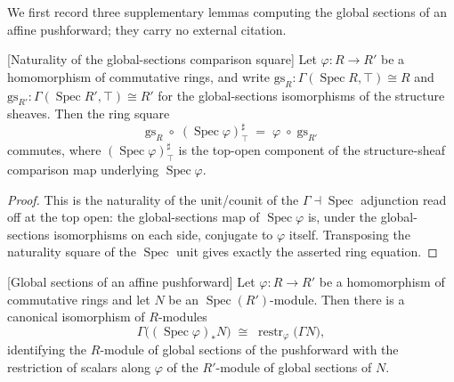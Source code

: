 We first record three supplementary lemmas computing the global sections of an
affine pushforward; they carry no external citation.

\begin{lemma}


[Naturality of the global-sections comparison square]
  \label{lem:globalSectionsIso_hom_comp_specMap_appTop}
  Let \(\varphi : R \to R'\) be a homomorphism of commutative rings, and write
  \(\mathrm{gs}_R : \Gamma(\operatorname{Spec} R, \top) \cong R\) and
  \(\mathrm{gs}_{R'} : \Gamma(\operatorname{Spec} R', \top) \cong R'\) for the
  global-sections isomorphisms of the structure sheaves. Then the ring square
  \[
    \mathrm{gs}_R \;\circ\; (\operatorname{Spec}\varphi)^{\sharp}_{\top}
    \;=\; \varphi \;\circ\; \mathrm{gs}_{R'}
  \]
  commutes, where \((\operatorname{Spec}\varphi)^{\sharp}_{\top}\) is the
  top-open component of the structure-sheaf comparison map underlying
  \(\operatorname{Spec}\varphi\).
\end{lemma}

\begin{proof}



  This is the naturality of the unit/counit of the
  \(\Gamma \dashv \operatorname{Spec}\) adjunction read off at the top open: the
  global-sections map of \(\operatorname{Spec}\varphi\) is, under the
  global-sections isomorphisms on each side, conjugate to \(\varphi\) itself.
  Transposing the naturality square of the \(\operatorname{Spec}\) unit gives
  exactly the asserted ring equation.
\end{proof}

\begin{lemma}


[Global sections of an affine pushforward]
  \label{lem:gammaPushforwardIso}
  Let \(\varphi : R \to R'\) be a homomorphism of commutative rings and let
  \(N\) be an \(\operatorname{Spec}(R')\)-module. Then there is a canonical
  isomorphism of \(R\)-modules
  \[
    \Gamma\bigl((\operatorname{Spec}\varphi)_* N\bigr)
    \;\cong\;
    \operatorname{restr}_\varphi\bigl(\Gamma N\bigr),
  \]
  identifying the \(R\)-module of global sections of the pushforward with the
  restriction of scalars along \(\varphi\) of the \(R'\)-module of global sections
  of \(N\).
\end{lemma}

